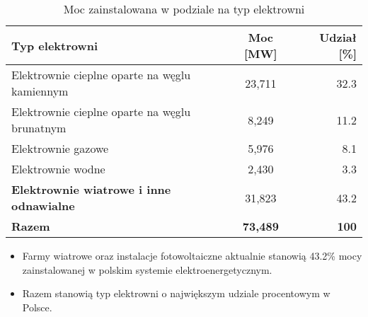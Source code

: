 \begin{table}
    \centering
    \footnotesize %
    \setlength{\tabcolsep}{5pt} %
    \begin{tabular}{lcr}
        \toprule
        \textbf{Typ elektrowni} & \textbf{Moc [MW]} & \textbf{Udział [\%]} \\
        \midrule
        Elektrownie cieplne oparte na węglu kamiennym & 23,711 & 32.3 \\
        Elektrownie cieplne oparte na węglu brunatnym & 8,249 & 11.2 \\
        Elektrownie gazowe & 5,976 & 8.1 \\
        Elektrownie wodne & 2,430 & 3.3 \\
        \textcolor{renewable}{\textbf{Elektrownie wiatrowe i inne odnawialne}} & 31,823 & 43.2 \\
        \midrule
        \textbf{Razem} & \textbf{73,489} & \textbf{100} \\
        \bottomrule
    \end{tabular}
    \caption{Moc zainstalowana w podziale na typ elektrowni}
\end{table}
\vspace{-0.5em} %
    \begin{itemize}
        \item Farmy wiatrowe oraz instalacje fotowoltaiczne aktualnie stanowią 43.2\% mocy zainstalowanej w polskim systemie elektroenergetycznym.
        \item Razem stanowią typ elektrowni o największym udziale procentowym w Polsce.
    \end{itemize}
